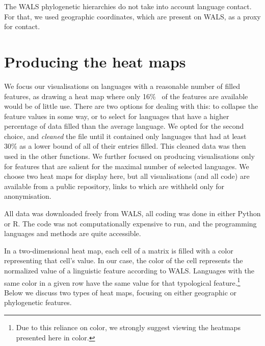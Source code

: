 \documentclass[11pt]{article}
\begin{document}
The WALS phylogenetic hierarchies do not take into account language contact. For that, we used geographic coordinates, which are present on WALS, as a proxy for contact. 



\section{Producing the heat maps}

We focus our visualisations on languages with a reasonable number of filled features, as 
drawing a heat map where only 16\%~ of the features are available would be of little use. 
There are two options for dealing with this: to collapse the feature values in some way, or to select for languages that have a higher percentage of data filled than the average language. We opted for the second choice, and \emph{cleaned}  the file until it contained only languages that had at least 30\% as a lower bound of all of their entries filled. This cleaned data was then used in the other functions. We further focused on producing visualisations only for features that are salient for the maximal number of selected languages. We choose two heat maps for display here, but all visualisations (and all code) are available from a public repository, links to which are withheld only for anonymisation.

All data was downloaded freely from WALS, all coding was done in either Python or R. The code was not computationally expensive to run, and the programming languages and methods are quite accessible. 

In a two-dimensional heat map, each cell of a matrix is filled with a color representing that cell's value. In our case, the color of the cell represents the normalized value of a linguistic feature according to WALS. Languages with the same color in a given row have the same value for that typological feature.\footnote{Due to this reliance on color, we strongly suggest viewing the heatmaps presented here in color.} Below we discuss two types of heat maps, focusing on either geographic or phylogenetic features.
\end{document}
